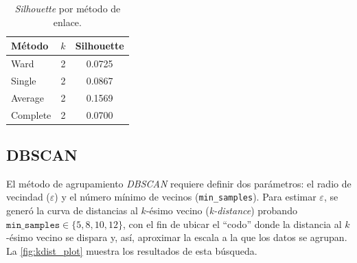 \documentclass[12pt,a4paper]{article}
\begin{document}
\begin{table}[ht]
  \centering
  \begin{small}
    \begin{tabular}{lcc}
      \toprule
      \textbf{Método} & \textbf{\(k\)} & \textbf{Silhouette} \\
      \midrule
      Ward     & 2 & 0.0725 \\
      Single   & 2 & 0.0867 \\
      Average  & 2 & 0.1569 \\
      Complete & 2 & 0.0700 \\
      \bottomrule
    \end{tabular}
    \caption{\emph{Silhouette} por método de enlace.}
    \label{tab:best_jerarquico}
  \end{small}
\end{table}

\subsection{DBSCAN}
El método de agrupamiento \emph{DBSCAN} requiere definir dos parámetros: el radio de vecindad 
(\(\varepsilon\)) y el número mínimo de vecinos (\texttt{min\_samples}). Para estimar \(\varepsilon\), 
se generó la curva de distancias al \(k\)-ésimo vecino (\emph{k-distance}) probando 
\(\texttt{min\_samples}\in\{5,8,10,12\}\), con el fin de ubicar el “codo” donde la distancia al 
\(k\)-ésimo vecino se dispara y, así, aproximar la escala a la que los datos se agrupan. La 
\cref{fig:kdist_plot} muestra los resultados de esta búsqueda.
\end{document}
